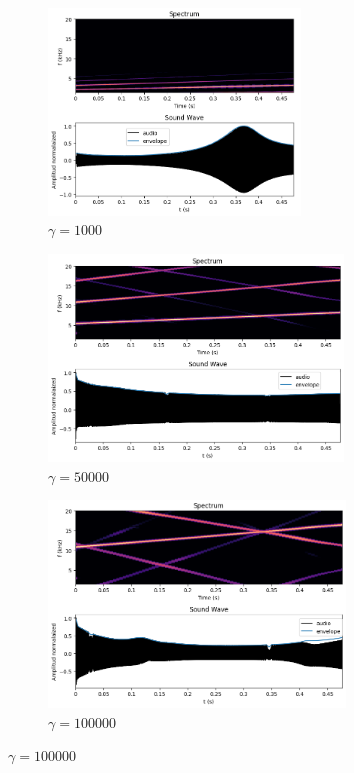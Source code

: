 \begin{figure}[H]
     \centering
     \begin{subfigure}[b]{0.48\textwidth}
         \centering
         \includegraphics[width=\textwidth, height=5.5cm]{Images/gamma1000.png}
         \caption{$\gamma=1000$}
         \label{fig:gamma1000}
     \end{subfigure}\hfill
     \begin{subfigure}[b]{0.48\textwidth}
         \centering
         \includegraphics[width=\textwidth, height=5.5cm]{Images/gamma50000.png}
         \caption{$\gamma=50000$}
         \label{fig:gamma50000}
     \end{subfigure}\hfill
     \begin{subfigure}[b]{0.48\textwidth}
         \centering
         \includegraphics[width=\textwidth, height=5.5cm]{Images/gamma100000.png}
         \caption{$\gamma=100000$ }
         \label{fig:gamma10000}
     \end{subfigure}\hfill

\end{figure}

